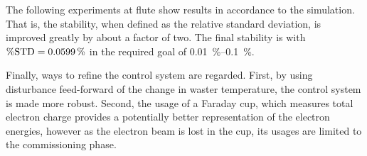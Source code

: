 The following experiments at \gls{flute} show results in accordance to the simulation. That is, the stability, when defined as the relative standard deviation, is improved greatly by about a factor of two. The final stability is with $\operatorname{\%STD}=\SI{0.0599}{\percent}$ in the required goal of \SIrange{0.01}{0.1}{\percent}.

Finally, ways to refine the control system are regarded. First, by using disturbance feed-forward of the change in waster temperature, the control system is made more robust. Second, the usage of a Faraday cup, which measures total electron charge provides a potentially better representation of the electron energies, however as the electron beam is lost in the cup, its usages are limited to the commissioning phase.
\cleardoublepage
